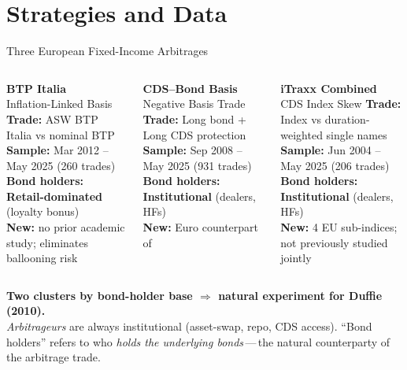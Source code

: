 \documentclass[aspectratio=169,11pt]{beamer}
\newcommand{\hltb}[1]{\textcolor{accentblue}{\textbf{#1}}}  %
\begin{document}
\section{Strategies and Data}

\begin{frame}[t]{Three European Fixed-Income Arbitrages}
\small
\vspace{0.10cm}

\begin{columns}[t]
\begin{block}{\textbf{BTP Italia}\\ \footnotesize Inflation-Linked Basis}
\scriptsize
\textbf{Trade:} ASW BTP Italia vs nominal BTP \\[3pt]
\textbf{Sample:} Mar 2012 -- May 2025 (260 trades) \\[3pt]
\textbf{Bond holders:} \\
\textcolor{myred}{\textbf{Retail-dominated}} (loyalty bonus) \\[3pt]
\textbf{New:} no prior academic study; eliminates ballooning risk
\end{block}

\begin{block}{\textbf{CDS--Bond Basis}\\ \footnotesize Negative Basis Trade}
\scriptsize
\textbf{Trade:} Long bond + Long CDS protection \\[3pt]
\textbf{Sample:} Sep 2008 -- May 2025 (931 trades) \\[3pt]
\textbf{Bond holders:} \\
\textcolor{mygreen}{\textbf{Institutional}} (dealers, HFs) \\[3pt]
\textbf{New:} Euro counterpart of \citet{bai2019cds}
\end{block}

\begin{block}{\textbf{iTraxx Combined}\\ \footnotesize CDS Index Skew}
\scriptsize
\textbf{Trade:} Index vs duration-weighted single names \\[3pt]
\textbf{Sample:} Jun 2004 -- May 2025 (206 trades) \\[3pt]
\textbf{Bond holders:} \\
\textcolor{mygreen}{\textbf{Institutional}} (dealers, HFs) \\[3pt]
\textbf{New:} 4 EU sub-indices; not previously studied jointly
\end{block}
\end{columns}

\vspace{0.45cm}

\centering
\hltb{Two clusters by bond-holder base $\Rightarrow$ natural experiment for Duffie\,(2010).}\\[0.15cm]
{\footnotesize \emph{Arbitrageurs} are always institutional (asset-swap, repo, CDS access).
``Bond holders'' refers to who \emph{holds the underlying bonds}\,---\,the natural counterparty
of the arbitrage trade.}

\end{frame}
\end{document}
